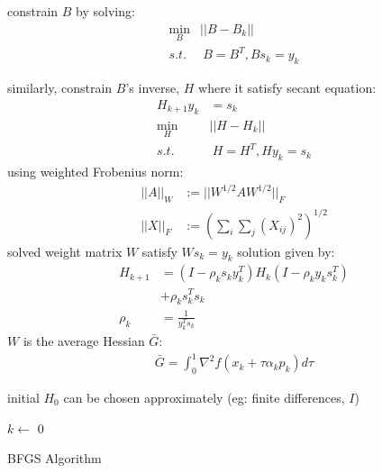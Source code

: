 \documentclass[8pt,letter]{article}
\begin{document}
\begin{multicols*}{2}
  constrain $B$ by solving:
  \begin{align*}
    \min_B & ||B-B_k||\\
    s.t. & \ B=B^T, Bs_k=y_k
  \end{align*}

  similarly, constrain $B$'s inverse, $H$ where it satisfy secant equation:
  \begin{align*}
    H_{k+1}y_k & = s_k\\
    \min_H & ||H-H_k||\\
    s.t. & \ H=H^T, Hy_k=s_k
  \end{align*}
  using weighted Frobenius norm:
  \begin{align*}
    ||A||_W & := ||W^{1/2}AW^{1/2}||_F\\
    ||X||_F & := (\sum_i \sum_j (X_{ij})^2)^{1/2}
  \end{align*}
  solved weight matrix $W$ satisfy $Ws_k=y_k$
  solution given by:
  \begin{align*}
    H_{k+1} & = (I-\rho_k s_k y_k^T)H_k(I-\rho_ky_ks_k^T) \\
            &+ \rho_k s_k^T s_k\\
    \rho_k & = \frac{1}{y_k^Ts_k}
  \end{align*}
  $W$ is the average Hessian $\bar{G}$:
  \begin{align*}
    \bar{G} = \int_0^1 \nabla^2 f(x_k+\tau \alpha_k p_k) d\tau
  \end{align*}
  
  initial $H_0$ can be chosen approximately (eg: finite differences, $I$)
  
  \begin{algorithm}[H]
    $k \leftarrow$ 0\\
    \caption{BFGS Algorithm\label{Algo_BFGS}}
  \end{algorithm}
  

\end{multicols*}
\end{document}

